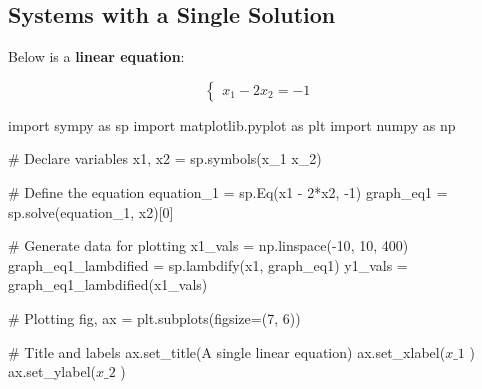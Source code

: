 \documentclass[
  letterpaper,
  DIV=11,
  numbers=noendperiod]{scrreprt}
\newenvironment{Shaded}{\begin{snugshade}}{\end{snugshade}}
\newcommand{\CommentTok}[1]{\textcolor[rgb]{0.37,0.37,0.37}{#1}}
\newcommand{\DecValTok}[1]{\textcolor[rgb]{0.68,0.00,0.00}{#1}}
\newcommand{\ImportTok}[1]{\textcolor[rgb]{0.00,0.46,0.62}{#1}}
\newcommand{\NormalTok}[1]{\textcolor[rgb]{0.00,0.23,0.31}{#1}}
\newcommand{\OperatorTok}[1]{\textcolor[rgb]{0.37,0.37,0.37}{#1}}
\newcommand{\StringTok}[1]{\textcolor[rgb]{0.13,0.47,0.30}{#1}}
\begin{document}

\hypertarget{systems-with-a-single-solution}{%
\subsection*{Systems with a Single
Solution}\label{systems-with-a-single-solution}}

Below is a \textbf{linear equation}:

\[
\begin{cases}
x_1 - 2x_2 = -1
\end{cases}
\]

\begin{Shaded}
\begin{Highlighting}[]
\ImportTok{import}\NormalTok{ sympy }\ImportTok{as}\NormalTok{ sp}
\ImportTok{import}\NormalTok{ matplotlib.pyplot }\ImportTok{as}\NormalTok{ plt}
\ImportTok{import}\NormalTok{ numpy }\ImportTok{as}\NormalTok{ np}

\CommentTok{\# Declare variables}
\NormalTok{x1, x2 }\OperatorTok{=}\NormalTok{ sp.symbols(}\StringTok{\textquotesingle{}x\_1 x\_2\textquotesingle{}}\NormalTok{)}

\CommentTok{\# Define the equation}
\NormalTok{equation\_1 }\OperatorTok{=}\NormalTok{ sp.Eq(x1 }\OperatorTok{{-}} \DecValTok{2}\OperatorTok{*}\NormalTok{x2, }\OperatorTok{{-}}\DecValTok{1}\NormalTok{)}
\NormalTok{graph\_eq1 }\OperatorTok{=}\NormalTok{ sp.solve(equation\_1, x2)[}\DecValTok{0}\NormalTok{]}

\CommentTok{\# Generate data for plotting}
\NormalTok{x1\_vals }\OperatorTok{=}\NormalTok{ np.linspace(}\OperatorTok{{-}}\DecValTok{10}\NormalTok{, }\DecValTok{10}\NormalTok{, }\DecValTok{400}\NormalTok{)}
\NormalTok{graph\_eq1\_lambdified }\OperatorTok{=}\NormalTok{ sp.lambdify(x1, graph\_eq1)}
\NormalTok{y1\_vals }\OperatorTok{=}\NormalTok{ graph\_eq1\_lambdified(x1\_vals)}

\CommentTok{\# Plotting}
\NormalTok{fig, ax }\OperatorTok{=}\NormalTok{ plt.subplots(figsize}\OperatorTok{=}\NormalTok{(}\DecValTok{7}\NormalTok{, }\DecValTok{6}\NormalTok{))}

\CommentTok{\# Title and labels}
\NormalTok{ax.set\_title(}\StringTok{\textquotesingle{}A single linear equation\textquotesingle{}}\NormalTok{)}
\NormalTok{ax.set\_xlabel(}\StringTok{\textquotesingle{}$x\_1$                                                                                                                            \textquotesingle{}}\NormalTok{)}
\NormalTok{ax.set\_ylabel(}\StringTok{\textquotesingle{}$x\_2$                                                                                                    \textquotesingle{}}\NormalTok{)}


\end{Highlighting}
\end{Shaded}
\end{document}
